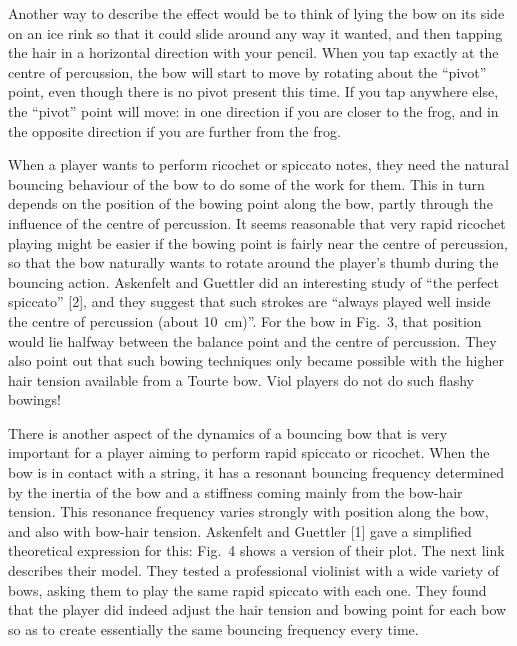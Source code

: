 
  Another way to describe the effect would be to think of lying the bow on its 
  side on an ice rink so that it could slide around any way it wanted, and then 
  tapping the hair in a horizontal direction with your pencil. When you tap 
  exactly at the centre of percussion, the bow will start to move by rotating 
  about the “pivot” point, even though there is no pivot present this time. If 
  you tap anywhere else, the “pivot” point will move: in one direction if you 
  are closer to the frog, and in the opposite direction if you are further from 
  the frog. 

  When a player wants to perform ricochet or spiccato notes, they need the 
  natural bouncing behaviour of the bow to do some of the work for them. This 
  in turn depends on the position of the bowing point along the bow, partly 
  through the influence of the centre of percussion. It seems reasonable that 
  very rapid ricochet playing might be easier if the bowing point is fairly 
  near the centre of percussion, so that the bow naturally wants to rotate 
  around the player’s thumb during the bouncing action. Askenfelt and Guettler 
  did an interesting study of “the perfect spiccato” [2], and they suggest that 
  such strokes are ``always played well inside the centre of percussion (about 
  10~cm)''. For the bow in Fig.\ 3, that position would lie halfway between the 
  balance point and the centre of percussion. They also point out that such 
  bowing techniques only became possible with the higher hair tension available 
  from a Tourte bow. Viol players do not do such flashy bowings! 

  There is another aspect of the dynamics of a bouncing bow that is very 
  important for a player aiming to perform rapid spiccato or ricochet. When the 
  bow is in contact with a string, it has a resonant bouncing frequency 
  determined by the inertia of the bow and a stiffness coming mainly from the 
  bow-hair tension. This resonance frequency varies strongly with position 
  along the bow, and also with bow-hair tension. Askenfelt and Guettler [1] 
  gave a simplified theoretical expression for this: Fig.\ 4 shows a version of 
  their plot. The next link describes their model. They tested a professional 
  violinist with a wide variety of bows, asking them to play the same rapid 
  spiccato with each one. They found that the player did indeed adjust the hair 
  tension and bowing point for each bow so as to create essentially the same 
  bouncing frequency every time. 

